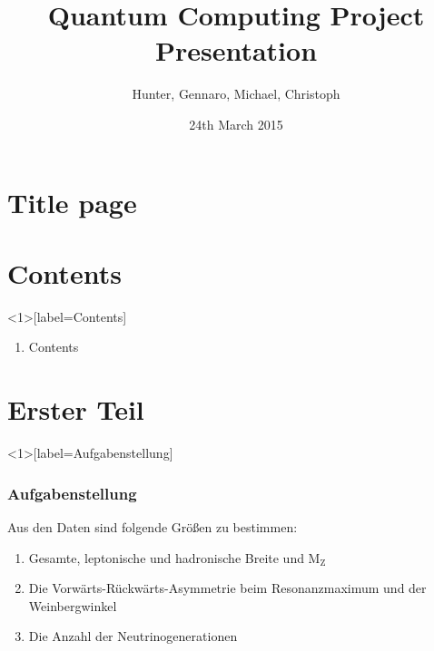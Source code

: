 \documentclass{beamer}
\begin{document}
\section{Title page}
\title{\textbf {Quantum Computing Project\\[0,75cm]
Presentation\\[1,5cm]}}
\author{Hunter, Gennaro, Michael, Christoph}
\date{24th March 2015}
\maketitle

\section{Contents}

\begin{frame}<1>[label=Contents]
	\begin{enumerate}
		\item Contents

	\end{enumerate}
\end{frame}

\section{Erster Teil}
%

\begin{frame}<1>[label=Aufgabenstellung]
	\frametitle{Aufgabenstellung}
	Aus den Daten sind folgende Größen zu bestimmen: 
	\begin{enumerate}
		\item Gesamte, leptonische und hadronische Breite und M$_\text{Z}$
		\item<2-> Die Vorwärts-Rückwärts-Asymmetrie beim Resonanzmaximum und der Weinbergwinkel
		\item<3> Die Anzahl der Neutrinogenerationen
	\end{enumerate}
\end{frame}
\end{document}
